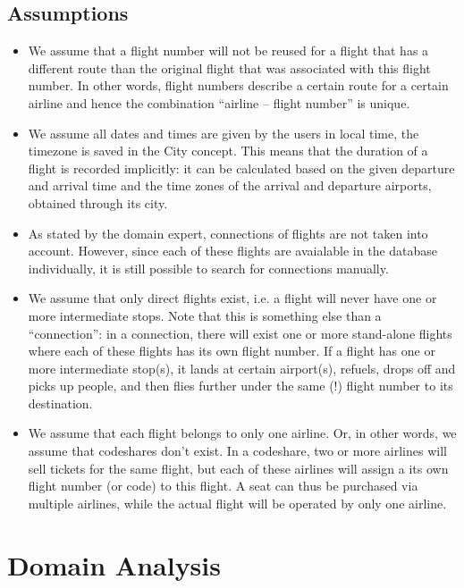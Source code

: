 \documentclass[a4paper,11pt]{article}
\begin{document}
\subsection{Assumptions}
\begin{itemize}
\item We assume that a flight number will not be reused for a flight that has a different route than the original flight that was associated with this flight number. In other words, flight numbers describe a certain route for a certain airline and hence the combination ``airline -- flight number'' is unique.

\item We assume all dates and times are given by the users in local time, the timezone is saved in the City concept. This means that the duration of a flight is recorded implicitly: it can be calculated based on the given departure and arrival time and the time zones of the arrival and departure airports, obtained through its city.

\item As stated by the domain expert, connections of flights are not taken into account. However, since each of these flights are avaialable in the database individually, it is still possible to search for connections manually.

\item We assume that only direct flights exist, i.e. a flight will never have one or more intermediate stops. Note that this is something else than a ``connection'': in a connection, there will exist one or more stand-alone flights where each of these flights has its own flight number. If a flight has one or more intermediate stop(s), it lands at certain airport(s), refuels, drops off and picks up people, and then flies further under the same (!) flight number to its destination.

\item We assume that each flight belongs to only one airline. Or, in other words, we assume that codeshares don't exist. In a codeshare, two or more airlines will sell tickets for the same flight, but each of these airlines will assign a its own flight number (or code) to this flight. A seat can thus be purchased via multiple airlines, while the actual flight will be operated by only one airline.
\end{itemize}

\newpage
\section{Domain Analysis}
\end{document}
